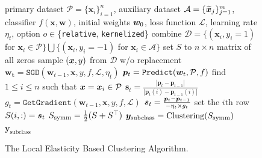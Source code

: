 \setlength\intextsep{0pt}
\begin{figure}
\begin{minipage}{1.0\textwidth}
\begin{algorithm}[H]
\begin{algorithmic}[1]
     \INPUT primary dataset $\mathcal{P}=\{\bm{x}_i\}^n_{i=1}$, auxiliary dataset $\mathcal{A} = \{\widetilde{\bm{x}}_j\}_{j=1}^m$, classifier $f(\bm{x}, \bm{w})$, initial weights $\bm{w}_0$, loss function $\mathcal{L}$, learning rate $\eta_t$, option $o\in$\{\texttt{relative}, \texttt{kernelized}\}
     \State combine $\mathcal{D}=\{(\bm{x}_i, y_i=1)$ for $\bm{x}_i \in \mathcal{P}\}\bigcup\{(\bm{x}_i, y_i=-1)$ for $\bm{x}_i \in \mathcal{A}\}$
     \State set $S$ to $n \times n$ matrix of all zeros
            \State sample $(\bm{x}, y)$ from $\mathcal{D}$ w/o replacement
            \State $\bm{w_t}=\texttt{SGD}(\bm{w}_{t-1}, \bm{x}, y, f, \mathcal{L}, \eta_t)$
                \State $\bm{p}_t=\texttt{Predict}(\bm{w}_t, \mathcal{P}, f)$
                \State find $1 \le i \le n$ such that $\bm{x} = \bm{x}_i \in \mathcal{P}$
                    \State $\bm{s}_t=\frac{\left| \bm{p}_t-\bm{p}_{t-1} \right|}{\left| \bm{p}_t(i)-\bm{p}_{t-1}(i) \right|}$
                \Else
                    \State $g_t=\texttt{GetGradient}(\bm{w}_{t-1}, \bm{x}, y, f, \mathcal{L})$
                    \State 
                    $\bm{s}_t= \frac{\bm{p}_t - \bm{p}_{t-1}}{-\eta_t \times g_t}$
                \EndIf
            \EndIf
            \State set the $i$th row $S(i,:) = \bm{s}_t$
     \EndFor
     \State $S_{\mathrm{symm}} = \frac{1}{2}(S + S^\top)$
     \State $\bm{y}_{\text{subclass}}=\text{Clustering}(S_{\mathrm{symm}})$
      $\bm{y}_{\text{subclass}}$
\end{algorithmic}
	\caption{The Local Elasticity Based Clustering Algorithm.}
	\label{algo:clustering}
\end{algorithm}
\end{minipage}
\end{figure}
